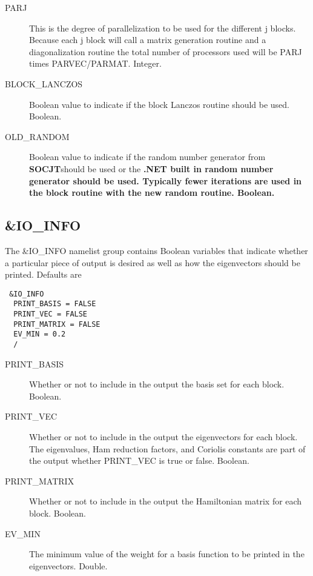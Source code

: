 \documentclass{article}
\newcommand{\socjt}{{\bf SOCJT}}
\begin{document}
\begin{description}
\item[PARJ] This is the degree of parallelization to be used for
  the different j blocks.  Because each j block will call a matrix
  generation routine and a diagonalization routine the total number
  of processors used will be PARJ times PARVEC/PARMAT. Integer.

\item[BLOCK\_LANCZOS] Boolean value to indicate if the block Lanczos
  routine should be used. Boolean.

\item[OLD\_RANDOM] Boolean value to indicate if the random number
  generator from \socjt should be used or the \bf{.NET} built in
  random number generator should be used. Typically fewer iterations
  are used in the block routine with the new random routine. Boolean.

\end{description}

\subsection{\&IO\_INFO}

The \&IO\_INFO namelist group contains Boolean variables that
indicate whether a particular piece of output is desired as well
as how the eigenvectors should be printed. Defaults are

\begin{verbatim}
 &IO_INFO
  PRINT_BASIS = FALSE
  PRINT_VEC = FALSE
  PRINT_MATRIX = FALSE
  EV_MIN = 0.2
  /
\end{verbatim}

\begin{description}

\item[PRINT\_BASIS] Whether or not to include in the output the basis
  set for each block. Boolean.

\item[PRINT\_VEC] Whether or not to include in the output the eigenvectors
  for each block. The eigenvalues, Ham reduction factors, and Coriolis
  constants are part of the output whether PRINT\_VEC is true or
  false. Boolean.

\item[PRINT\_MATRIX] Whether or not to include in the output the Hamiltonian
  matrix for each block. Boolean.
  
\item[EV\_MIN] The minimum value of the weight for a basis function to be 
  printed in the eigenvectors. Double.

\end{description}
\end{document}
